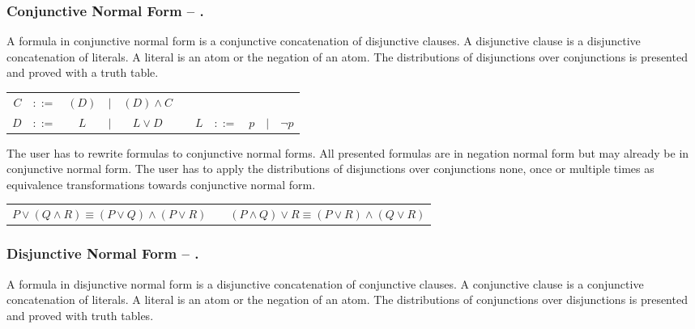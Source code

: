 \subsubsection{Conjunctive Normal Form – .}
\label{tut:43}
A formula in conjunctive normal form is a conjunctive concatenation of disjunctive clauses.
A disjunctive clause is a disjunctive concatenation of literals. 
A literal is an atom or the negation of an atom. 
The distributions of disjunctions over conjunctions is presented
and proved with a truth table.

\begin{center}
\begin{tabular}{rccccp{1cm}rcccl}
$C$	&$::=$ & $(D)$ 	&$|$ & $(D) \wedge C$ \\
$D$	&$::=$ & $L$ 	&$|$ & $L \vee D$ &&
$L$	&$::=$ & $p$ 	&$|$ & $\neg p$ 
\end{tabular}
\end{center}

The user has to rewrite formulas to conjunctive normal forms.  
All presented formulas are in negation normal form 
but may already be in conjunctive normal form.
The user has to apply the distributions of disjunctions over conjunctions 
none, once or multiple times
as equivalence transformations towards conjunctive normal form.

\begin{center}
\begin{tabular}{cp{5mm}c}
$P \vee (Q \wedge R) \equiv (P\vee Q) \wedge (P\vee R)$ & &
$(P \wedge Q) \vee R \equiv (P\vee R) \wedge (Q\vee R)$
\end{tabular}
\end{center}


\subsubsection{Disjunctive Normal Form – .}
\label{tut:44}
A formula in disjunctive normal form is a disjunctive concatenation of conjunctive clauses.
A conjunctive clause is a conjunctive concatenation of literals. 
A literal is an atom or the negation of an atom. 
The distributions of conjunctions over disjunctions is presented
and proved with truth tables.

